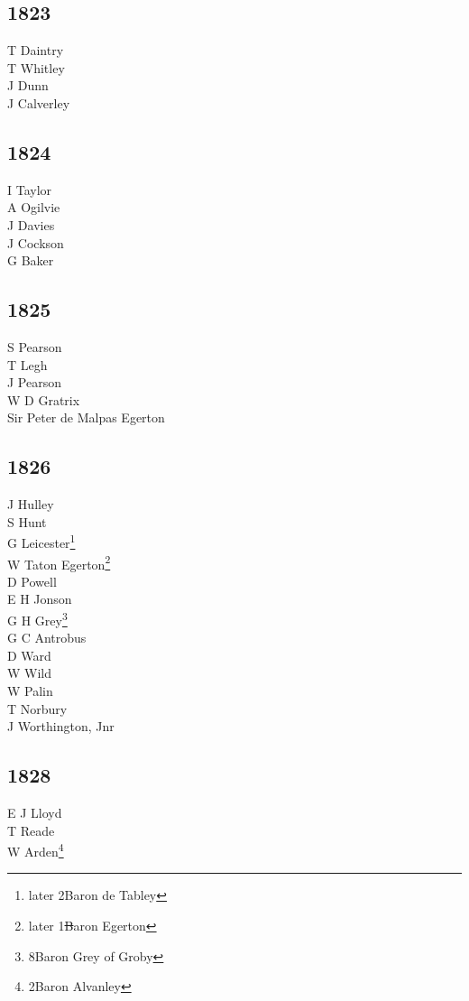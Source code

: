 \begin{multicols}{3}
  \subsection*{1823}
  T Daintry \\
  T Whitley \\
  J Dunn \\
  J Calverley \\
  \subsection*{1824}
  I Taylor \\
  A Ogilvie \\
  J Davies \\
  J Cockson \\
  G Baker \\
  \subsection*{1825}
  S Pearson \\
  T Legh \\
  J Pearson \\
  W D Gratrix \\
  Sir Peter de Malpas Egerton \\
  \subsection*{1826}
  J Hulley \\
  S Hunt \\
  G Leicester\footnote{later 2\nd Baron de Tabley} \\
  W Taton Egerton\footnote{later 1\st Baron Egerton} \\
  D Powell \\
  E H Jonson \\
  G H Grey\footnote{8\nth Baron Grey of Groby} \\
  G C Antrobus \\
  D Ward \\
  W Wild \\
  W Palin \\
  T Norbury \\
  J Worthington, Jnr \\
  \subsection*{1828}
  E J Lloyd \\
  T Reade \\
  W Arden\footnote{2\nd Baron Alvanley} \\

\end{multicols}
